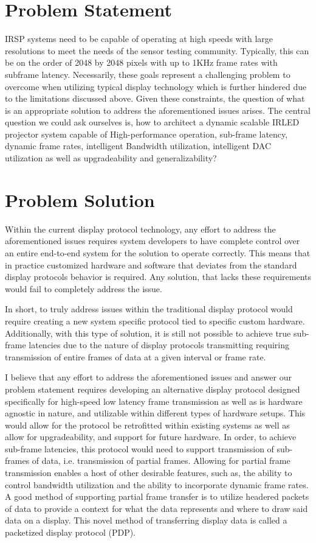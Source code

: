 \section{Problem Statement}
    IRSP systems need to be capable of operating at high speeds with large resolutions to meet the needs of the sensor testing community. Typically, this can be on the order of 2048 by 2048 pixels with up to 1KHz frame rates with subframe latency. Necessarily, these goals represent a challenging problem to overcome when utilizing typical display technology which is further hindered due to the limitations discussed above. Given these constraints, the question of what is an appropriate solution to address the aforementioned issues arises. The central question we could ask ourselves is, how to architect a dynamic scalable IRLED projector system capable of High-performance operation, sub-frame latency, dynamic frame rates, intelligent Bandwidth utilization, intelligent DAC utilization as well as upgradeability and generalizability?

\section{Problem Solution}
    Within the current display protocol technology, any effort to address the aforementioned issues requires system developers to have complete control over an entire end-to-end system for the solution to operate correctly. This means that in practice customized hardware and software that deviates from the standard display protocols behavior is required. Any solution, that lacks these requirements would fail to completely address the issue.

    In short, to truly address issues within the traditional display protocol would require creating a new system specific protocol tied to specific custom hardware. Additionally, with this type of solution, it is still not possible to achieve true sub-frame latencies due to the nature of display protocols transmitting requiring transmission of entire frames of data at a given interval or frame rate.

    I believe that any effort to address the aforementioned issues and answer our problem statement requires developing an alternative display protocol designed specifically for high-speed low latency frame transmission as well as is hardware agnostic in nature, and utilizable within different types of hardware setups. This would allow for the protocol be retrofitted within existing systems as well as allow for upgradeability, and support for future hardware. In order, to achieve sub-frame latencies, this protocol would need to support transmission of sub-frames of data, i.e. transmission of partial frames. Allowing for partial frame transmission enables a host of other desirable features, such as, the ability to control bandwidth utilization and the ability to incorporate dynamic frame rates. A good method of supporting partial frame transfer is to utilize headered packets of data to provide a context for what the data represents and where to draw said data on a display. This novel method of transferring display data is called a packetized display protocol (PDP).

